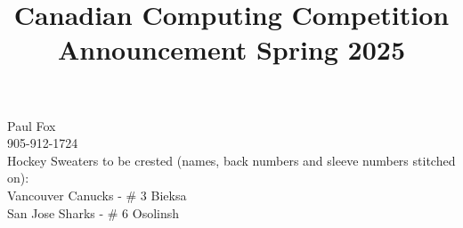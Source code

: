 \documentclass[26pt, letterpaper]{article}
\title{Canadian Computing Competition Announcement Spring 2025}
\begin{document}
\huge{

Paul Fox\\

905-912-1724\\


Hockey Sweaters to be crested (names, back numbers and sleeve numbers stitched on):\\


Vancouver Canucks - \# 3 Bieksa\\


San Jose Sharks - \# 6 Osolinsh\\


}
\end{document}
